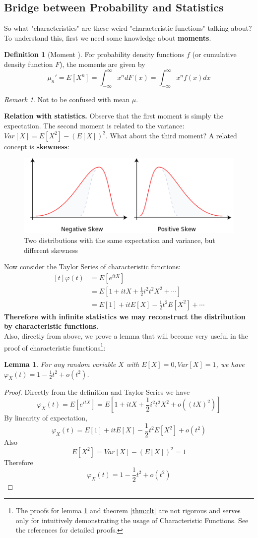 \documentclass{article}
\theoremstyle{definition}
\newtheorem{definition}{Definition}[section]
\theoremstyle{plain}
\newtheorem{lemma}{Lemma}[section]
\theoremstyle{remark}
\newtheorem*{remark}{Remark}
\begin{document}
\subsection{Bridge between Probability and Statistics}
So what "characteristics" are these weird "characteristic functions" talking about? To understand this, first we need some knowledge about \textbf{moments}.
\begin{definition}[Moment \cite{wiki:moment}]
For probability density functions $f$ (or cumulative density function $F$), the moments are given by
$$\mu_n' = E[X^n] = \int_{-\infty}^\infty x^ndF(x) = \int_{-\infty}^\infty x^nf(x)dx $$
\end{definition}
\begin{remark}
Not to be confused with mean $\mu$. 
\end{remark}
\noindent\textbf{Relation with statistics.} Observe that the first moment is simply the expectation. The second moment is related to the variance: $Var[X]=E[X^2]-(E[X])^2$. What about the third moment? A related concept is \textbf{skewness}\cite{wiki:skewness}:
\begin{figure}[H]
	\centering
	\includegraphics[width=0.8\linewidth]{img/Negative_and_positive_skew_diagrams_(English)}
	\caption{Two distributions with the same expectation and variance, but different skewness} 
	\label{fig:skewness}
\end{figure}
Now consider the Taylor Series of characteristic functions:
$$\begin{aligned}[t]
\varphi(t) & =E[e^{itX}]  \\
& =E[1+itX+\frac12i^2t^2X^2+\cdots] \\
& =E[1] + itE[X]-\frac12t^2E[X^2] + \cdots
\end{aligned}$$
\textbf{Therefore with infinite statistics we may reconstruct the distribution by characteristic functions.}\\
Also, directly from above, we prove a lemma that will become very useful in the proof of characteristic functions\footnote{The proofs for lemma \ref{lem:clt} and theorem \ref{thm:clt} are not rigorous and serves only for intuitively demonstrating the usage of Characteristic Functions. See the references\cite{waterloo,nus} for detailed proofs.}:
\begin{lemma}
	For any random variable $X$ with $E[X]=0,Var[X]=1$, we have $\varphi_X(t)=1-\frac12t^2+o(t^2)$.
	\label{lem:clt}
\end{lemma}
\begin{proof}
	Directly from the definition and Taylor Series we have
	$$\varphi_X(t)=E[e^{itX}]=E[1+itX+\frac12i^2t^2X^2+o((tX)^2)]$$
	By linearity of expectation,
	$$\varphi_X(t)=E[1]+itE[X]-\frac12t^2E[X^2]+o(t^2)$$
	Also
	$$E[X^2]=Var[X]-(E[X])^2=1$$
	Therefore $$\varphi_X(t)=1-\frac12t^2+o(t^2)$$
\end{proof}
\end{document}
